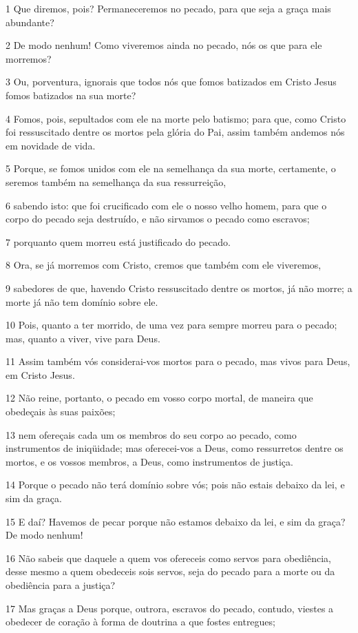 \par 1 Que diremos, pois? Permaneceremos no pecado, para que seja a graça mais abundante?
\par 2 De modo nenhum! Como viveremos ainda no pecado, nós os que para ele morremos?
\par 3 Ou, porventura, ignorais que todos nós que fomos batizados em Cristo Jesus fomos batizados na sua morte?
\par 4 Fomos, pois, sepultados com ele na morte pelo batismo; para que, como Cristo foi ressuscitado dentre os mortos pela glória do Pai, assim também andemos nós em novidade de vida.
\par 5 Porque, se fomos unidos com ele na semelhança da sua morte, certamente, o seremos também na semelhança da sua ressurreição,
\par 6 sabendo isto: que foi crucificado com ele o nosso velho homem, para que o corpo do pecado seja destruído, e não sirvamos o pecado como escravos;
\par 7 porquanto quem morreu está justificado do pecado.
\par 8 Ora, se já morremos com Cristo, cremos que também com ele viveremos,
\par 9 sabedores de que, havendo Cristo ressuscitado dentre os mortos, já não morre; a morte já não tem domínio sobre ele.
\par 10 Pois, quanto a ter morrido, de uma vez para sempre morreu para o pecado; mas, quanto a viver, vive para Deus.
\par 11 Assim também vós considerai-vos mortos para o pecado, mas vivos para Deus, em Cristo Jesus.
\par 12 Não reine, portanto, o pecado em vosso corpo mortal, de maneira que obedeçais às suas paixões;
\par 13 nem ofereçais cada um os membros do seu corpo ao pecado, como instrumentos de iniqüidade; mas oferecei-vos a Deus, como ressurretos dentre os mortos, e os vossos membros, a Deus, como instrumentos de justiça.
\par 14 Porque o pecado não terá domínio sobre vós; pois não estais debaixo da lei, e sim da graça.
\par 15 E daí? Havemos de pecar porque não estamos debaixo da lei, e sim da graça? De modo nenhum!
\par 16 Não sabeis que daquele a quem vos ofereceis como servos para obediência, desse mesmo a quem obedeceis sois servos, seja do pecado para a morte ou da obediência para a justiça?
\par 17 Mas graças a Deus porque, outrora, escravos do pecado, contudo, viestes a obedecer de coração à forma de doutrina a que fostes entregues;
